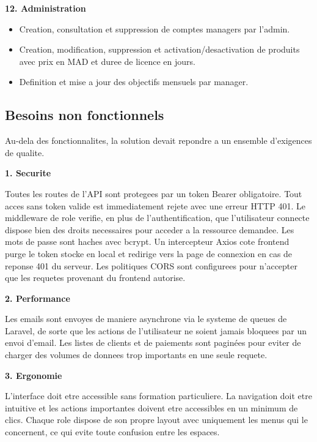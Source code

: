 \documentclass[12pt, a4paper]{report}
\begin{document}
\vspace{0.3cm}
\textbf{12. Administration}

\begin{itemize}
  \item Creation, consultation et suppression de comptes managers par l'admin.
  \item Creation, modification, suppression et activation/desactivation de
        produits avec prix en MAD et duree de licence en jours.
  \item Definition et mise a jour des objectifs mensuels par manager.
\end{itemize}

\subsection{Besoins non fonctionnels}

Au-dela des fonctionnalites, la solution devait repondre a un ensemble
d'exigences de qualite.

\vspace{0.3cm}
\textbf{1. Securite}

Toutes les routes de l'API sont protegees par un token Bearer obligatoire.
Tout acces sans token valide est immediatement rejete avec une erreur HTTP 401.
Le middleware de role verifie, en plus de l'authentification, que l'utilisateur
connecte dispose bien des droits necessaires pour acceder a la ressource
demandee. Les mots de passe sont haches avec bcrypt. Un intercepteur Axios
cote frontend purge le token stocke en local et redirige vers la page de
connexion en cas de reponse 401 du serveur. Les politiques CORS sont
configurees pour n'accepter que les requetes provenant du frontend autorise.

\vspace{0.3cm}
\textbf{2. Performance}

Les emails sont envoyes de maniere asynchrone via le systeme de queues de
Laravel, de sorte que les actions de l'utilisateur ne soient jamais bloquees
par un envoi d'email. Les listes de clients et de paiements sont paginées
pour eviter de charger des volumes de donnees trop importants en une seule
requete.

\vspace{0.3cm}
\textbf{3. Ergonomie}

L'interface doit etre accessible sans formation particuliere. La navigation
doit etre intuitive et les actions importantes doivent etre accessibles en
un minimum de clics. Chaque role dispose de son propre layout avec uniquement
les menus qui le concernent, ce qui evite toute confusion entre les espaces.
\end{document}
